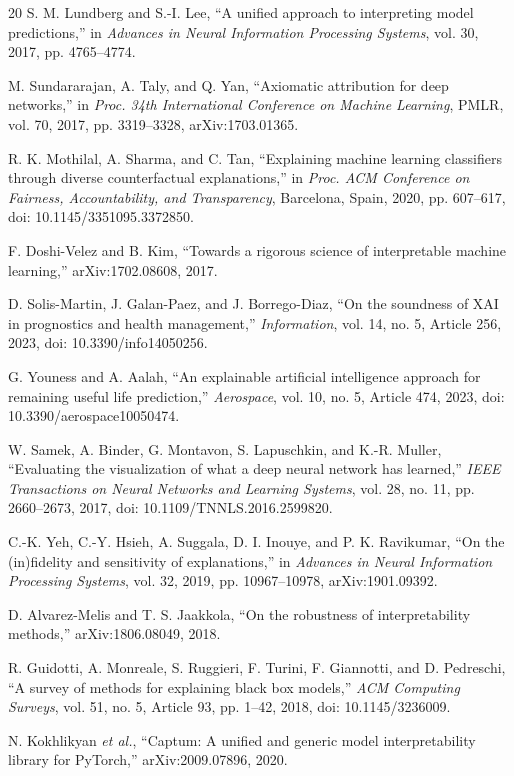 \documentclass[conference]{IEEEtran}
\begin{document}
\begin{thebibliography}{20}
S. M. Lundberg and S.-I. Lee, ``A unified approach to interpreting model predictions,'' in \emph{Advances in Neural Information Processing Systems}, vol. 30, 2017, pp. 4765--4774.

M. Sundararajan, A. Taly, and Q. Yan, ``Axiomatic attribution for deep networks,'' in \emph{Proc. 34th International Conference on Machine Learning}, PMLR, vol. 70, 2017, pp. 3319--3328, arXiv:1703.01365.

R. K. Mothilal, A. Sharma, and C. Tan, ``Explaining machine learning classifiers through diverse counterfactual explanations,'' in \emph{Proc. ACM Conference on Fairness, Accountability, and Transparency}, Barcelona, Spain, 2020, pp. 607--617, doi: 10.1145/3351095.3372850.

F. Doshi-Velez and B. Kim, ``Towards a rigorous science of interpretable machine learning,'' arXiv:1702.08608, 2017.

D. Solis-Martin, J. Galan-Paez, and J. Borrego-Diaz, ``On the soundness of XAI in prognostics and health management,'' \emph{Information}, vol. 14, no. 5, Article 256, 2023, doi: 10.3390/info14050256.

G. Youness and A. Aalah, ``An explainable artificial intelligence approach for remaining useful life prediction,'' \emph{Aerospace}, vol. 10, no. 5, Article 474, 2023, doi: 10.3390/aerospace10050474.

W. Samek, A. Binder, G. Montavon, S. Lapuschkin, and K.-R. Muller, ``Evaluating the visualization of what a deep neural network has learned,'' \emph{IEEE Transactions on Neural Networks and Learning Systems}, vol. 28, no. 11, pp. 2660--2673, 2017, doi: 10.1109/TNNLS.2016.2599820.

C.-K. Yeh, C.-Y. Hsieh, A. Suggala, D. I. Inouye, and P. K. Ravikumar, ``On the (in)fidelity and sensitivity of explanations,'' in \emph{Advances in Neural Information Processing Systems}, vol. 32, 2019, pp. 10967--10978, arXiv:1901.09392.

D. Alvarez-Melis and T. S. Jaakkola, ``On the robustness of interpretability methods,'' arXiv:1806.08049, 2018.

R. Guidotti, A. Monreale, S. Ruggieri, F. Turini, F. Giannotti, and D. Pedreschi, ``A survey of methods for explaining black box models,'' \emph{ACM Computing Surveys}, vol. 51, no. 5, Article 93, pp. 1--42, 2018, doi: 10.1145/3236009.

N. Kokhlikyan \emph{et al.}, ``Captum: A unified and generic model interpretability library for PyTorch,'' arXiv:2009.07896, 2020.
\end{thebibliography}
\end{document}
